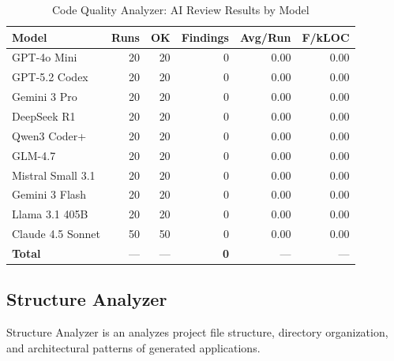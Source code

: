 \begin{table}[htbp]
    \centering
    \caption{Code Quality Analyzer: AI Review Results by Model}
    \label{tab:tool_codequalanalyzer}
    \small
    \begin{tabular}{@{} l r r r r r @{}}
        \toprule
        \textbf{Model} & \textbf{Runs} & \textbf{OK} & \textbf{Findings} & \textbf{Avg/Run} & \textbf{F/kLOC} \\
        \midrule
        GPT-4o Mini & 20 & 20 & 0 & 0.00 & 0.00 \\
        GPT-5.2 Codex & 20 & 20 & 0 & 0.00 & 0.00 \\
        Gemini 3 Pro & 20 & 20 & 0 & 0.00 & 0.00 \\
        DeepSeek R1 & 20 & 20 & 0 & 0.00 & 0.00 \\
        Qwen3 Coder+ & 20 & 20 & 0 & 0.00 & 0.00 \\
        GLM-4.7 & 20 & 20 & 0 & 0.00 & 0.00 \\
        Mistral Small 3.1 & 20 & 20 & 0 & 0.00 & 0.00 \\
        Gemini 3 Flash & 20 & 20 & 0 & 0.00 & 0.00 \\
        Llama 3.1 405B & 20 & 20 & 0 & 0.00 & 0.00 \\
        Claude 4.5 Sonnet & 50 & 50 & 0 & 0.00 & 0.00 \\
        \midrule
        \textbf{Total} & --- & --- & \textbf{0} & --- & --- \\
        \bottomrule
    \end{tabular}
\end{table}

\subsection{Structure Analyzer}

Structure Analyzer is an analyzes project file structure, directory organization, and architectural patterns of generated applications.

